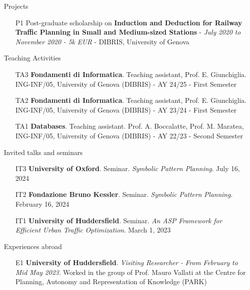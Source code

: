 \documentclass{resume} %
\begin{document}
\begin{rSection}{Projects}

\begin{enumerate}[leftmargin=5mm]
\item[P1] Post-graduate scholarship on \textbf{Induction and Deduction for Railway Traffic Planning in Small and Medium-sized Stations} - \textit{July 2020 to November 2020 - 5k EUR} - DIBRIS, University of Genova
\end{enumerate}
\end{rSection}

\begin{rSection}{Teaching Activities}
\begin{enumerate}[leftmargin=5mm]
\item[TA3] \textbf{Fondamenti di Informatica}. Teaching assistant, Prof. E. Giunchiglia. ING-INF/05, University of Genova (DIBRIS) - AY 24/25 - First Semester
\item[TA2] \textbf{Fondamenti di Informatica}. Teaching assistant, Prof. E. Giunchiglia. ING-INF/05, University of Genova (DIBRIS) - AY 23/24 - First Semester
\item[TA1] \textbf{Databases}. Teaching assistant. Prof. A. Boccalatte, Prof. M. Maratea, ING-INF/05, University of Genova (DIBRIS) - AY 22/23 - Second Semester
\end{enumerate}
\end{rSection}

\begin{rSection}{Invited talks and seminars}
\begin{enumerate}[leftmargin=5mm]
	\item[IT3] \textbf{University of Oxford}. Seminar. \textit{Symbolic Pattern Planning}. July 16, 2024
	\item[IT2] \textbf{Fondazione Bruno Kessler}. Seminar. \textit{Symbolic Pattern Planning}. February 16, 2024
	\item[IT1] \textbf{University of Huddersfield}. Seminar. \textit{An ASP Framework for Efficient Urban Traffic Optimization}. March 1, 2023
\end{enumerate}


\end{rSection}

\begin{rSection}{Experiences abroad}
\begin{enumerate}[leftmargin=5mm]
\item[E1] \textbf{University of Huddersfield}. \textit{Visiting Researcher - From February to Mid May 2023}. Worked in the group of Prof. Mauro Vallati at the Centre for Planning, Autonomy and Representation of Knowledge (PARK)  
\end{enumerate}
\end{rSection}
\end{document}
